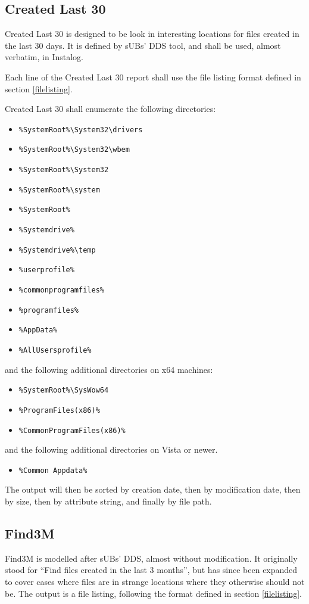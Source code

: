 \subsection{Created Last 30}
Created Last 30 is designed to be look in interesting locations for files
created in the last 30 days. It is defined by sUBs' DDS tool, and shall be used,
almost verbatim, in Instalog.

Each line of the Created Last 30 report shall use the file listing format
defined in section \ref{filelisting}.

Created Last 30 shall enumerate the following directories:
\begin{itemize}
    \item \verb|%SystemRoot%\System32\drivers|
	\item \verb|%SystemRoot%\System32\wbem|
	\item \verb|%SystemRoot%\System32|
	\item \verb|%SystemRoot%\system|
	\item \verb|%SystemRoot%|
	\item \verb|%Systemdrive%|
	\item \verb|%Systemdrive%\temp|
	\item \verb|%userprofile%|
	\item \verb|%commonprogramfiles%|
	\item \verb|%programfiles%|
	\item \verb|%AppData%|
	\item \verb|%AllUsersprofile%|
\end{itemize}
and the following additional directories on x64 machines:
\begin{itemize}
	\item \verb|%SystemRoot%\SysWow64|
	\item \verb|%ProgramFiles(x86)%|
	\item \verb|%CommonProgramFiles(x86)%|
\end{itemize}
and the following additional directories on Vista or newer.
\begin{itemize}
    \item \verb|%Common Appdata%|
\end{itemize}

The output will then be sorted by creation date, then by modification date, then
by size, then by attribute string, and finally by file path.

\subsection{Find3M}
Find3M is modelled after sUBs' DDS, almost without modification. It
originally stood for ``Find files created in the last 3 months'', but has since been expanded to
cover cases where files are in strange locations where they otherwise should not
be. The output is a file listing, following the format defined in section
\ref{filelisting}.

